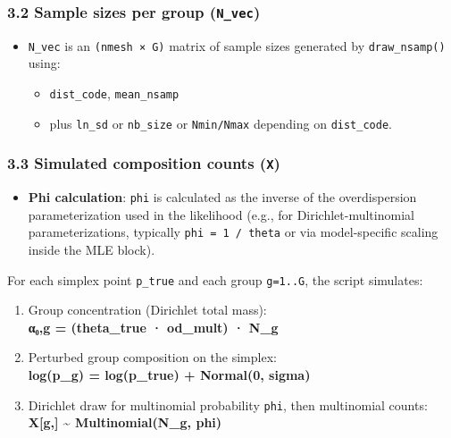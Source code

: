 \documentclass[
]{article}
\providecommand{\tightlist}{%
  \setlength{\itemsep}{0pt}\setlength{\parskip}{0pt}}
\begin{document}
\subsubsection{\texorpdfstring{3.2 Sample sizes per group
(\texttt{N\_vec})}{3.2 Sample sizes per group (N\_vec)}}\label{sample-sizes-per-group-n_vec}

\begin{itemize}
\tightlist
\item
  \texttt{N\_vec} is an \texttt{(nmesh\ ×\ G)} matrix of sample sizes
  generated by \texttt{draw\_nsamp()} using:

  \begin{itemize}
  \tightlist
  \item
    \texttt{dist\_code}, \texttt{mean\_nsamp}
  \item
    plus \texttt{ln\_sd} or \texttt{nb\_size} or \texttt{Nmin/Nmax}
    depending on \texttt{dist\_code}.
  \end{itemize}
\end{itemize}

\subsubsection{\texorpdfstring{3.3 Simulated composition counts
(\texttt{X})}{3.3 Simulated composition counts (X)}}\label{simulated-composition-counts-x}

\begin{itemize}
\tightlist
\item
  \textbf{Phi calculation}: \texttt{phi} is calculated as the inverse of
  the overdispersion parameterization used in the likelihood (e.g., for
  Dirichlet-multinomial parameterizations, typically
  \texttt{phi\ =\ 1\ /\ theta} or via model-specific scaling inside the
  MLE block).
\end{itemize}

For each simplex point \texttt{p\_true} and each group \texttt{g=1..G},
the script simulates:

\begin{enumerate}
\def\labelenumi{\arabic{enumi}.}
\tightlist
\item
  Group concentration (Dirichlet total mass):\\
  \textbf{α₀,g = (theta\_true · od\_mult) · N\_g}
\item
  Perturbed group composition on the simplex:\\
  \textbf{log(p\_g) = log(p\_true) + Normal(0, sigma)}
\item
  Dirichlet draw for multinomial probability \texttt{phi}, then
  multinomial counts:\\
  \textbf{X{[}g,{]} \textasciitilde{} Multinomial(N\_g, phi)}
\end{enumerate}
\end{document}

